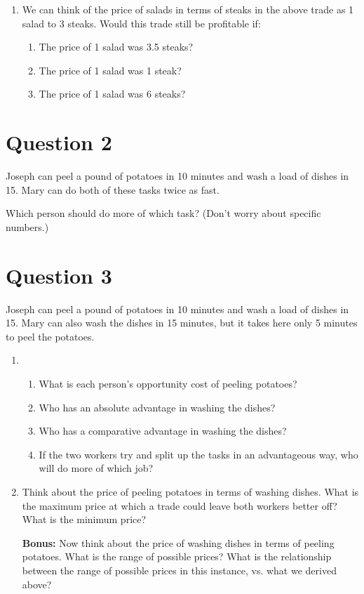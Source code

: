 \documentclass[12pt]{article}
\begin{document}
\begin{enumerate}
\item We can think of the price of salads in terms of steaks in the above trade as 1 salad to 3 steaks. Would this trade still be profitable if:

\begin{enumerate}
    \item The price of 1 salad was 3.5 steaks?
    \item The price of 1 salad was 1 steak?
    \item The price of 1 salad was 6 steaks?
\end{enumerate}

\end{enumerate}

\section*{Question 2}
Joseph can peel a pound of potatoes in 10 minutes and wash a load of dishes in 15. Mary can do both of these tasks twice as fast. 

\medskip

Which person should do more of which task? (Don't worry about specific numbers.)

\section*{Question 3}
Joseph can peel a pound of potatoes in 10 minutes and wash a load of dishes in 15. Mary can also wash the dishes in 15 minutes, but it takes here only 5 minutes to peel the potatoes. 
    
\begin{enumerate}
\item 
    \begin{enumerate}
        \item What is each person's opportunity cost of peeling potatoes?
        \item Who has an absolute advantage in washing the dishes?
        \item Who has a comparative advantage in washing the dishes?
        \item If the two workers try and split up the tasks in an advantageous way, who will do more of which job?
    \end{enumerate}


\item Think about the price of peeling potatoes in terms of washing dishes. What is the maximum price at which a trade could leave both workers better off? What is the minimum price?

\medskip

\textbf{Bonus:} Now think about the price of washing dishes in terms of peeling potatoes. What is the range of possible prices? What is the relationship between the range of possible prices in this instance, vs. what we derived above?

\end{enumerate}
\end{document}
